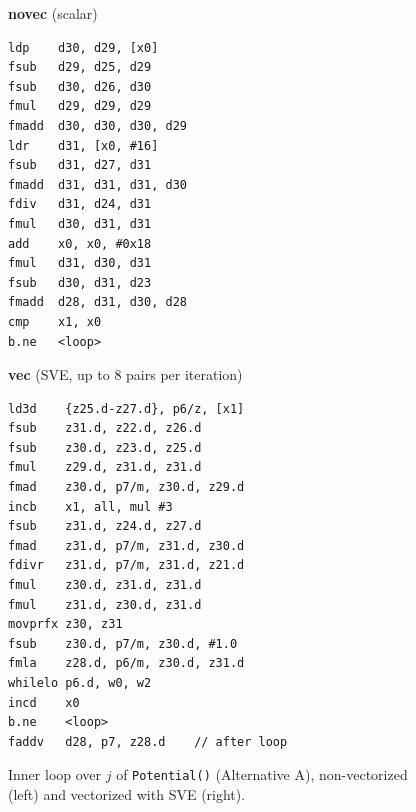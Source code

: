 \documentclass[conference]{IEEEtran}
\begin{document}
\begin{figure}[!t]
\centering
\begin{minipage}[t]{0.42\textwidth}
\footnotesize
\textbf{novec} (scalar)
\begin{verbatim}
ldp    d30, d29, [x0]
fsub   d29, d25, d29
fsub   d30, d26, d30
fmul   d29, d29, d29
fmadd  d30, d30, d30, d29
ldr    d31, [x0, #16]
fsub   d31, d27, d31
fmadd  d31, d31, d31, d30
fdiv   d31, d24, d31
fmul   d30, d31, d31
add    x0, x0, #0x18
fmul   d31, d30, d31
fsub   d30, d31, d23
fmadd  d28, d31, d30, d28
cmp    x1, x0
b.ne   <loop>
\end{verbatim}
\end{minipage}
\hfill
\begin{minipage}[t]{0.52\textwidth}
\footnotesize
\textbf{vec} (SVE, up to 8 pairs per iteration)
\begin{verbatim}
ld3d    {z25.d-z27.d}, p6/z, [x1]
fsub    z31.d, z22.d, z26.d
fsub    z30.d, z23.d, z25.d
fmul    z29.d, z31.d, z31.d
fmad    z30.d, p7/m, z30.d, z29.d
incb    x1, all, mul #3
fsub    z31.d, z24.d, z27.d
fmad    z31.d, p7/m, z31.d, z30.d
fdivr   z31.d, p7/m, z31.d, z21.d
fmul    z30.d, z31.d, z31.d
fmul    z31.d, z30.d, z31.d
movprfx z30, z31
fsub    z30.d, p7/m, z30.d, #1.0
fmla    z28.d, p6/m, z30.d, z31.d
whilelo p6.d, w0, w2
incd    x0
b.ne    <loop>
faddv   d28, p7, z28.d    // after loop
\end{verbatim}
\end{minipage}
\caption{Inner loop over $j$ of \texttt{Potential()} (Alternative A),
non-vectorized (left) and vectorized with SVE (right).}
\label{fig:asm}
\end{figure}
\end{document}
